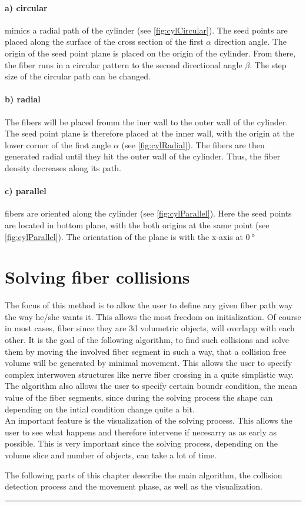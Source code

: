 \paragraph{a) circular} mimics a radial path of the cylinder (see \cref{fig:cylCircular}).
The seed points are placed along the surface of the cross section of the first $\alpha$ direction angle.
The origin of the seed point plane is placed on the origin of the cylinder.
From there, the fiber runs in a circular pattern to the second directional angle $\beta$.
The step size of the circular path can be changed.
% 
\paragraph{b) radial} The fibers will be placed fromm the iner wall to the outer wall of the cylinder.
The seed point plane is therefore placed at the inner wall, with the origin at the lower corner of the first angle $\alpha$ (see \cref{fig:cylRadial}).
The fibers are then generated radial until they hit the outer wall of the cylinder.
Thus, the fiber density decreases along its path.
% 
\paragraph{c) parallel} fibers are oriented along the cylinder (see \cref{fig:cylParallel}).
Here the seed points are located in bottom plane, with the both origins at the same point (see \cref{fig:cylParallel}). The orientation of the plane is with the x-axis at $\SI{0}{\degree}$
% 
% 
% 
\section{Solving fiber collisions}
\label{sec:Solver}
% 
% 
The focus of this method is to allow the user to define any given fiber path way the way he/she wants it.
This allows the most freedom on initialization.
Of course in most cases, fiber since they are 3d volumetric objects, will overlapp with each other.
It is the goal of the following algorithm, to find such collisions and solve them by moving the involved fiber segment in such a way, that a collision free volume will be generated by minimal movement.
% 
This allows the user to specify complex interwoven structures like nerve fiber crossing in a quite simplistic way.
% 
The algorithm also allows the user to specify certain boundr condition, \eg{} the mean value of the fiber segments, since during the solving process the shape can depending on the intial condition change quite a bit.
\\
An important feature is the visualization of the solving process.
This allows the user to see what happens and therefore intervene if necesarry as as early as possible.
This is very important since the solving process, depending on the volume slice and number of objects, can take a lot of time.
\par
% 
The following parts of this chapter describe the main algorithm, \ie{} the collision detection process and the movement phase, as well as the visualization.
% 
\par
\noindent\rule{\textwidth}{2pt}
\par
% 
%
